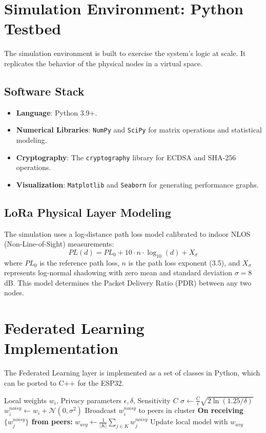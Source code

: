 \section{Simulation Environment: Python Testbed}

The simulation environment is built to exercise the system's logic at scale. It replicates the behavior of the physical nodes in a virtual space.

\subsection{Software Stack}
\begin{itemize}
\item \textbf{Language}: Python 3.9+.
\item \textbf{Numerical Libraries}: \texttt{NumPy} and \texttt{SciPy} for matrix operations and statistical modeling.
\item \textbf{Cryptography}: The \texttt{cryptography} library for ECDSA and SHA-256 operations.
\item \textbf{Visualization}: \texttt{Matplotlib} and \texttt{Seaborn} for generating performance graphs.
\end{itemize}

\subsection{LoRa Physical Layer Modeling}
The simulation uses a log-distance path loss model calibrated to indoor NLOS (Non-Line-of-Sight) measurements:
\[
PL(d) = PL_0 + 10 \cdot n \cdot \log_{10}(d) + X_\sigma
\]
where $PL_0$ is the reference path loss, $n$ is the path loss exponent (3.5), and $X_\sigma$ represents log-normal shadowing with zero mean and standard deviation $\sigma = 8$ dB. This model determines the Packet Delivery Ratio (PDR) between any two nodes.

\section{Federated Learning Implementation}

The Federated Learning layer is implemented as a set of classes in Python, which can be ported to C++ for the ESP32.

\begin{algorithm}[H]
\caption{Federated Averaging with Differential Privacy}
\label{alg:fedavg_dp}
\begin{algorithmic}[1]
\REQUIRE Local weights $w_i$, Privacy parameters $\epsilon, \delta$, Sensitivity $C$
\STATE $\sigma \leftarrow \frac{C}{\epsilon} \sqrt{2 \ln(1.25/\delta)}$ 
\STATE $w_i^{noisy} \leftarrow w_i + \mathcal{N}(0, \sigma^2)$ 
\STATE Broadcast $w_i^{noisy}$ to peers in cluster
\STATE \textbf{On receiving $\{w_j^{noisy}\}$ from peers:}
\STATE $w_{avg} \leftarrow \frac{1}{|K|} \sum_{j \in K} w_j^{noisy}$ 
\STATE Update local model with $w_{avg}$
\end{algorithmic}
\end{algorithm}

